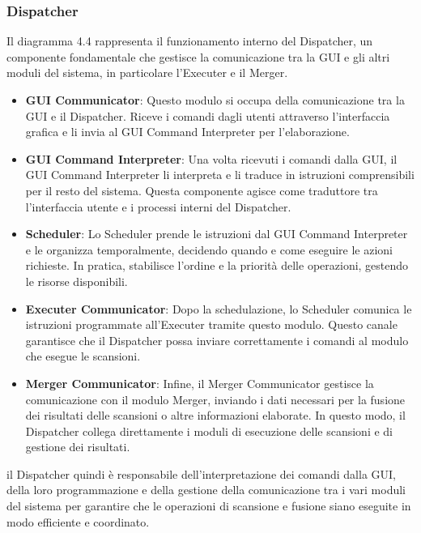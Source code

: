 \documentclass[target=bach,aauheader=,style=]{thud}
\begin{document}
\subsubsection{Dispatcher} 
Il diagramma 4.4 rappresenta il funzionamento interno del Dispatcher, un componente fondamentale che gestisce la comunicazione tra la GUI e gli altri moduli del sistema, in particolare l'Executer e il Merger.

\begin{itemize}
  \item \textbf{GUI Communicator}: Questo modulo si occupa della comunicazione tra la GUI e il Dispatcher. Riceve i comandi dagli utenti attraverso l'interfaccia grafica e li invia al GUI Command Interpreter per l'elaborazione.

  \item \textbf{GUI Command Interpreter}: Una volta ricevuti i comandi dalla GUI, il GUI Command Interpreter li interpreta e li traduce in istruzioni comprensibili per il resto del sistema. Questa componente agisce come traduttore tra l'interfaccia utente e i processi interni del Dispatcher.

  \item \textbf{Scheduler}: Lo Scheduler prende le istruzioni dal GUI Command Interpreter e le organizza temporalmente, decidendo quando e come eseguire le azioni richieste. In pratica, stabilisce l'ordine e la priorità delle operazioni, gestendo le risorse disponibili.

  \item \textbf{Executer Communicator}: Dopo la schedulazione, lo Scheduler comunica le istruzioni programmate all'Executer tramite questo modulo. Questo canale garantisce che il Dispatcher possa inviare correttamente i comandi al modulo che esegue le scansioni.

  \item \textbf{Merger Communicator}: Infine, il Merger Communicator gestisce la comunicazione con il modulo Merger, inviando i dati necessari per la fusione dei risultati delle scansioni o altre informazioni elaborate. In questo modo, il Dispatcher collega direttamente i moduli di esecuzione delle scansioni e di gestione dei risultati.
\end{itemize}

il Dispatcher quindi è responsabile dell'interpretazione dei comandi dalla GUI, della loro programmazione e della gestione della comunicazione tra i vari moduli del sistema per garantire che le operazioni di scansione e fusione siano eseguite in modo efficiente e coordinato.
\end{document}
